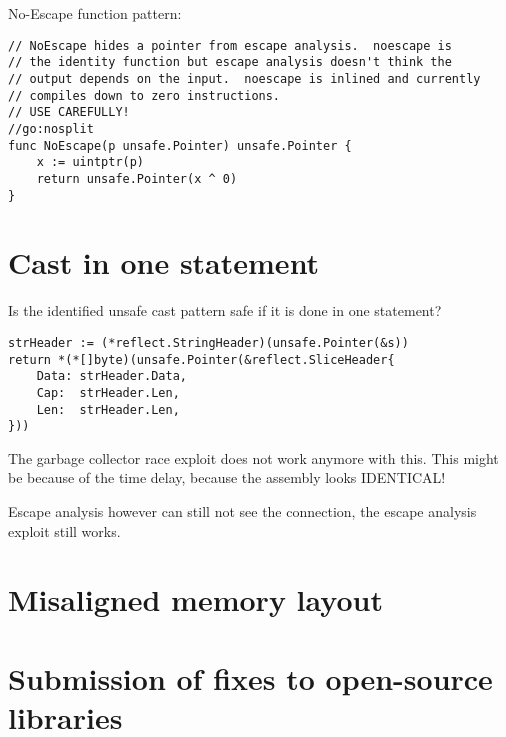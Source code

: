 No-Escape function pattern:

\begin{lstlisting}[language=Golang, label=lst:no-escape-function, caption=No-Escape Function Pattern]
// NoEscape hides a pointer from escape analysis.  noescape is
// the identity function but escape analysis doesn't think the
// output depends on the input.  noescape is inlined and currently
// compiles down to zero instructions.
// USE CAREFULLY!
//go:nosplit
func NoEscape(p unsafe.Pointer) unsafe.Pointer {
    x := uintptr(p)
    return unsafe.Pointer(x ^ 0)
}
\end{lstlisting}



\section{Cast in one statement}\label{sec:cast-1-statement}

Is the identified unsafe cast pattern safe if it is done in one statement?

\begin{lstlisting}[language=Golang, label=lst:cast-1-statement, caption=Unsafe slice cast in one single statement]
strHeader := (*reflect.StringHeader)(unsafe.Pointer(&s))
return *(*[]byte)(unsafe.Pointer(&reflect.SliceHeader{
    Data: strHeader.Data,
    Cap:  strHeader.Len,
    Len:  strHeader.Len,
}))
\end{lstlisting}

The garbage collector race exploit does not work anymore with this.
This might be because of the time delay, because the assembly looks IDENTICAL!

Escape analysis however can still not see the connection, the escape analysis exploit still works.



\section{Misaligned memory layout}\label{sec:vulnerability-alignment}



\section{Submission of fixes to open-source libraries}\label{sec:vulnerability-fixes}

